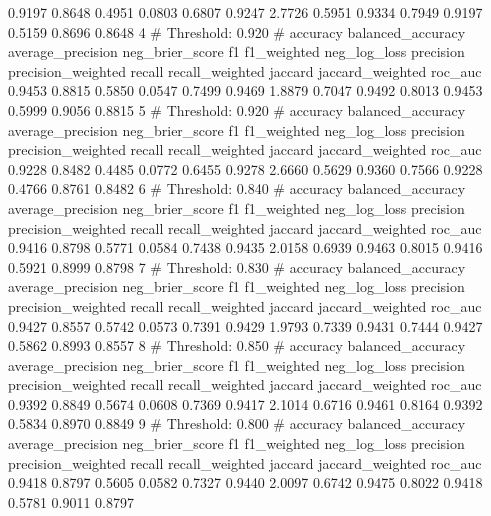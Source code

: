 0.9197
0.8648
0.4951
0.0803
0.6807
0.9247
2.7726
0.5951
0.9334
0.7949
0.9197
0.5159
0.8696
0.8648
4
# Threshold: 0.920
# accuracy  balanced_accuracy  average_precision  neg_brier_score  f1  f1_weighted  neg_log_loss  precision  precision_weighted  recall  recall_weighted  jaccard  jaccard_weighted  roc_auc
0.9453
0.8815
0.5850
0.0547
0.7499
0.9469
1.8879
0.7047
0.9492
0.8013
0.9453
0.5999
0.9056
0.8815
5
# Threshold: 0.920
# accuracy  balanced_accuracy  average_precision  neg_brier_score  f1  f1_weighted  neg_log_loss  precision  precision_weighted  recall  recall_weighted  jaccard  jaccard_weighted  roc_auc
0.9228
0.8482
0.4485
0.0772
0.6455
0.9278
2.6660
0.5629
0.9360
0.7566
0.9228
0.4766
0.8761
0.8482
6
# Threshold: 0.840
# accuracy  balanced_accuracy  average_precision  neg_brier_score  f1  f1_weighted  neg_log_loss  precision  precision_weighted  recall  recall_weighted  jaccard  jaccard_weighted  roc_auc
0.9416
0.8798
0.5771
0.0584
0.7438
0.9435
2.0158
0.6939
0.9463
0.8015
0.9416
0.5921
0.8999
0.8798
7
# Threshold: 0.830
# accuracy  balanced_accuracy  average_precision  neg_brier_score  f1  f1_weighted  neg_log_loss  precision  precision_weighted  recall  recall_weighted  jaccard  jaccard_weighted  roc_auc
0.9427
0.8557
0.5742
0.0573
0.7391
0.9429
1.9793
0.7339
0.9431
0.7444
0.9427
0.5862
0.8993
0.8557
8
# Threshold: 0.850
# accuracy  balanced_accuracy  average_precision  neg_brier_score  f1  f1_weighted  neg_log_loss  precision  precision_weighted  recall  recall_weighted  jaccard  jaccard_weighted  roc_auc
0.9392
0.8849
0.5674
0.0608
0.7369
0.9417
2.1014
0.6716
0.9461
0.8164
0.9392
0.5834
0.8970
0.8849
9
# Threshold: 0.800
# accuracy  balanced_accuracy  average_precision  neg_brier_score  f1  f1_weighted  neg_log_loss  precision  precision_weighted  recall  recall_weighted  jaccard  jaccard_weighted  roc_auc
0.9418
0.8797
0.5605
0.0582
0.7327
0.9440
2.0097
0.6742
0.9475
0.8022
0.9418
0.5781
0.9011
0.8797
